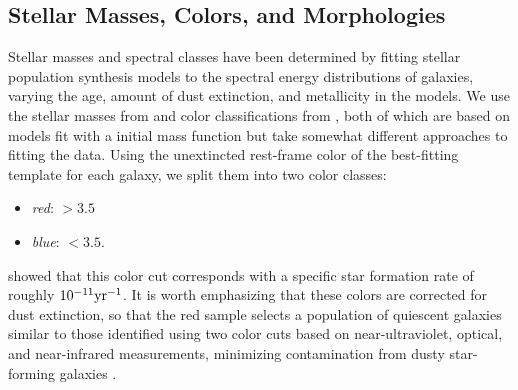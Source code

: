 \subsection{Stellar Masses, Colors, and Morphologies}
\label{tran_s:otherdata}

Stellar masses and spectral classes have been determined by fitting
stellar population synthesis models to the spectral energy
distributions of galaxies, varying the age, amount of dust extinction,
and metallicity in the models. We use the stellar masses from
\citet{Bundy2010} and color classifications from \citet{Ilbert2010},
both of which are based on \citet{Bruzual2003} models fit with a
\citet{Chabrier2003} initial mass function but take
somewhat different approaches to fitting the data. Using the
unextincted rest-frame color \nuvr of the best-fitting template for
each galaxy, we split them into two color classes:
\begin{itemize}
\item{\textit{red}: \nuvr $>3.5$}
\item{\textit{blue}: \nuvr $<3.5$.}
\end{itemize}
\citet{Ilbert2010} showed that this color cut corresponds with a
specific star formation rate of roughly $10^{-11} \rm{yr^{-1}}$.
It is worth emphasizing that these colors are corrected for dust
extinction, so that the red sample selects a population of quiescent
galaxies similar to those identified using two color cuts based on
near-ultraviolet, optical, and near-infrared measurements, minimizing
contamination from dusty star-forming galaxies
\citep[e.g.,][]{Bundy2010}.

